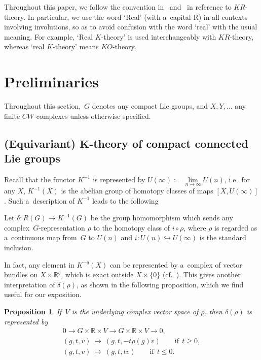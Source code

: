 \documentclass[pdftex]{sigma}
\numberwithin{equation}{section}
\newtheorem{Proposition}[Theorem]{Proposition}
{\theoremstyle{definition}
\newtheorem{Definition}[Theorem]{Definition}
\newtheorem{Example}[Theorem]{Example}
\newtheorem{Remark}[Theorem]{Remark}
}
\begin{document}
Throughout this paper, we follow the convention in~\cite{At3} and~\cite{AS} in reference to $KR$-theory.
In particular, we use the word `Real' (with a~capital R) in all contexts involving involutions, so as to avoid confusion
with the word `real' with the usual meaning.
For example, `Real $K$-theory' is used interchangeably with $KR$-theory, whereas `real $K$-theory' means $KO$-theory.

\vspace{-1mm}

\section{Preliminaries}\label{Section2}

Throughout this section,~$G$ denotes any compact Lie groups, and $X, Y, \dots$ any f\/inite $CW$-complexes unless
otherwise specif\/ied.

\vspace{-1mm}

\subsection[(Equivariant) $K$-theory of compact connected Lie groups]{(Equivariant)
$\boldsymbol{K}$-theory of compact connected Lie groups}

Recall that the functor $K^{-1}$ is represented by $U(\infty):=\lim\limits_{n\to\infty}U(n)$, i.e.\
for any $X$, $K^{-1}(X)$ is the abelian group of homotopy classes of maps $[X, U(\infty)]$.
Such a~description of $K^{-1}$ leads to the following
\begin{Definition}
\label{betamap}
Let $\delta: R(G)\to K^{-1}(G)$ be the group homomorphism which sends any complex~$G$-representation $\rho$ to the
homotopy class of $i\circ \rho$, where $\rho$ is regarded as a~continuous map from~$G$ to $U(n)$ and $i:
U(n)\hookrightarrow U(\infty)$ is the standard inclusion.
\end{Definition}

{\samepage In fact, any element in $K^{-q}(X)$ can be represented by a~complex of vector bundles on $X\times \mathbb{R}^q$, which
is exact outside $X\times\{0\}$ (cf.~\cite{At}).
This gives another interpretation of $\delta(\rho)$, as shown in the following proposition,
which we f\/ind useful for our
exposition.}

\begin{Proposition}
\label{-1_class}
If~$V$ is the underlying complex vector space of $\rho$, then $\delta(\rho)$ is represented by
\begin{gather*}
0\to G\times\mathbb{R}\times V \to G\times\mathbb{R}\times V\to 0,
\\
(g, t, v) \ \mapsto\  (g, t, -t\rho(g)v) \qquad\text{if} \ \ t\geq 0,
\\
(g, t, v) \ \mapsto\  (g, t, tv) \qquad\text{if}\ \  t\leq 0.
\end{gather*}
\end{Proposition}
\end{document}
